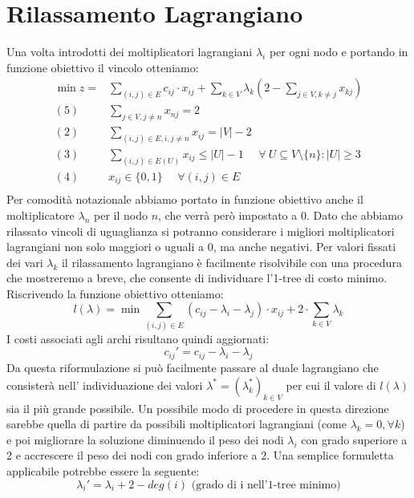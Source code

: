 \documentclass[
	article,			%
	12pt,				%
	oneside,			%
	a4paper,			%
	english,			%
	italian,				%
	sumario=tradicional,
	]{abntex2}
\begin{document}
\section{Rilassamento Lagrangiano}
Una volta introdotti dei moltiplicatori lagrangiani $\lambda_i$ per ogni nodo e portando in funzione obiettivo il vincolo otteniamo:
\begin{equation*}
    \begin{split}
         \min z = & \sum_{(i,j) \in E} c_{ij} \cdot x_{ij} + \sum_{k\in V} \lambda_k (2 - \sum_{j\in V, k\neq j} x_{kj})\\
        (5)\:\:\:\:\:\: & \sum_{j \in V, j \neq n} x_{nj} = 2 \\
        (2) \:\:\:\:\:\: & \sum_{(i,j)\in E, i, j \neq n} x_{ij} = |V|-2 \\
        (3) \:\:\:\:\:\: & \sum_{(i,j) \in E(U)} x_{ij} \leq |U| - 1 \:\:\:\:\:\: \forall\: U \subseteq V\setminus\{n\} : |U| \geq 3 \\
        (4) \:\:\:\:\:\: & x_{ij} \in \{0,1\} \:\:\:\:\:\: \forall (i,j) \in E\\
    \end{split}
\end{equation*}
Per comodità notazionale abbiamo portato in funzione obiettivo anche il moltiplicatore $\lambda_n$ per il nodo $n$, che verrà però impostato a 0. Dato che abbiamo rilassato vincoli di uguaglianza si potranno considerare i migliori moltiplicatori lagrangiani non solo maggiori o uguali a 0, ma anche negativi. Per valori fissati dei vari $\lambda_k$ il rilassamento lagrangiano è facilmente risolvibile con una procedura che mostreremo a breve, che consente di individuare l'1-tree di costo minimo.
\newpage
Riscrivendo la funzione obiettivo otteniamo:
\begin{equation*}
    l(\lambda) = \min \sum_{(i,j)\in E} ( c_{ij} - \lambda_i - \lambda_j) \cdot x_{ij} + 2 \cdot \sum_{k \in V} \lambda_k
\end{equation*}
I costi associati agli archi risultano quindi aggiornati:
\begin{equation*}
    c_{ij}' = c_{ij} - \lambda_i - \lambda_j
\end{equation*}
Da questa riformulazione si può facilmente passare al duale lagrangiano che consisterà nell' individuazione dei valori $\lambda^* = (\lambda_k^*)_{k\in V}$ per cui il valore di $l(\lambda)$ sia il più grande possibile. Un possibile modo di procedere in questa direzione sarebbe quella di partire da possibili moltiplicatori lagrangiani (come $\lambda_k = 0, \forall k$) e poi migliorare la soluzione diminuendo il peso dei nodi $\lambda_i$ con grado superiore a 2 e accrescere il peso dei nodi con grado inferiore a 2. Una semplice formuletta applicabile potrebbe essere la seguente:
\begin{equation*}
    \lambda_i' = \lambda_i + 2 - deg(i) \text{ (grado di i nell'1-tree minimo)}
\end{equation*}
\end{document}
